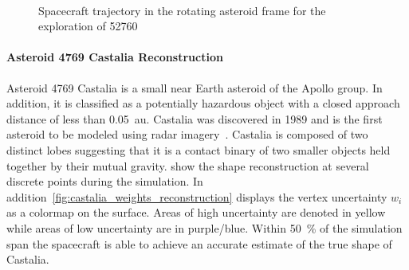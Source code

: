 \begin{figure}[htbp]
    \centering
    \\%
    \caption{Spacecraft trajectory in the rotating asteroid frame for the exploration of 52760~\label{fig:52760_trajectory}}
\end{figure}

\paragraph{Asteroid 4769 Castalia Reconstruction}

Asteroid 4769 Castalia is a small near Earth asteroid of the Apollo group.
In addition, it is classified as a potentially hazardous object with a closed approach distance of less than \SI{0.05}{\astronomicalunit}.
Castalia was discovered in \num{1989} and is the first asteroid to be modeled using radar imagery~\cite{hudson1994}.
Castalia is composed of two distinct lobes suggesting that it is a contact binary of two smaller objects held together by their mutual gravity.
 show the shape reconstruction at several discrete points during the simulation.
In addition~\cref{fig:castalia_weights_reconstruction} displays the vertex uncertainty \( w_i \) as a colormap on the surface. 
Areas of high uncertainty are denoted in yellow while areas of low uncertainty are in purple/blue.
Within \SI{50}{\percent} of the simulation span the spacecraft is able to achieve an accurate estimate of the true shape of Castalia.

